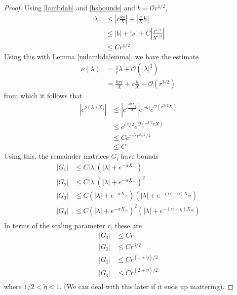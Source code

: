 \documentclass[thesis.tex]{subfiles}
\begin{document}
\begin{lemma}
\begin{proof}
Using \cref{lambdah} and \cref{hsbounds} and $b = \mathcal{O}{r^{1/2}}$,
\begin{align*}
|\lambda| &\leq \left| c \frac{k \pi }{X} \right| + \left|\frac{c}{X}h \right| \\
&\leq |b| + |s| + C\left|\frac{r^{1/2}}{X^{1/2}} \right| \\
&\leq C r^{1/2} 
\end{align*}
Using this with Lemma \ref{nulambdalemma}, we have the estimate
\begin{align*}
\nu(\lambda) &= \frac{1}{c}\lambda + \mathcal{O}(|\lambda|^3) \\
&= \frac{k \pi i}{X} + c \frac{h}{X} + \mathcal{O}(r^{3/2})
\end{align*}
from which it follows that
\begin{align*}
|e^{\nu(\lambda)X_j}| &\leq 
\left| e^{i \frac{k \pi X_j}{X}}\right| e^{|c h|} e^{\mathcal{O}(r^{3/2}X)} \\
&\leq
e^{c \pi/2} e^{\mathcal{O}(r^{1/2} rX)} \\
&\leq C e^{r^{1/2} c^2 \pi^2 / 4} \\
&\leq C
\end{align*}
Using this, the remainder matrices $G_i$ have bounds
\begin{align*}
|G_1| &\leq C |\lambda| (|\lambda| + e^{-\alpha X_m} )\\
|G_2| &\leq C |\lambda| (|\lambda| + e^{-\alpha X_m} )^2 \\
|G_3| &\leq C (|\lambda| + e^{-\alpha X_m} )(|\lambda| + e^{-(\alpha-\eta) X_m} )\\
|G_4| &\leq C (|\lambda| + e^{-\alpha X_m} )^2(|\lambda| + e^{-(\alpha-\eta) X_m} ) \\
\end{align*}
In terms of the scaling parameter $r$, these are
\begin{align*}
|G_1| &\leq C r \\
|G_2| &\leq C r^{3/2} \\
|G_3| &\leq C r^{(1 + \tilde{\eta})/2} \\
|G_4| &\leq C r^{(2 + \tilde{\eta})/2}  \\
\end{align*}
where $1/2 < \tilde{\eta} < 1$. (We can deal with this later if it ends up mattering).


\end{proof}
\end{lemma}
\end{document}
